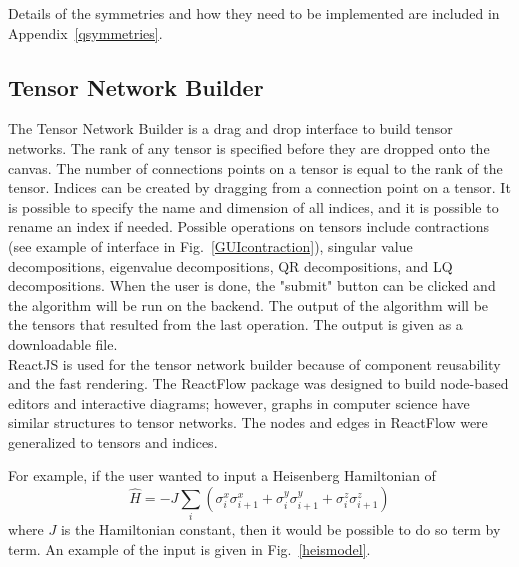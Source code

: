 \documentclass{juliacon}
\begin{document}
Details of the symmetries and how they need to be implemented are included in Appendix~\ref{qsymmetries}.


\subsection{Tensor Network Builder}
The Tensor Network Builder is a drag and drop interface to build tensor networks. The rank of any tensor is specified before they are dropped onto the canvas. The number of connections points on a tensor is equal to the rank of the tensor. Indices can be created by dragging from a connection point on a tensor. It is possible to specify the name and dimension of all indices, and it is possible to rename an index if needed. Possible operations on tensors include contractions (see example of interface in Fig.~\ref{GUIcontraction}), singular value decompositions, eigenvalue decompositions, QR decompositions, and LQ decompositions. When the user is done, the "submit" button can be clicked and the algorithm will be run on the backend. The output of the algorithm will be the tensors that resulted from the last operation. The output is given as a downloadable file.\\

ReactJS is used for the tensor network builder because of component reusability and the fast rendering. The ReactFlow package was designed to build node-based editors and interactive diagrams; however, graphs in computer science have similar structures to tensor networks. The nodes and edges in ReactFlow were generalized to tensors and indices. 

For example, if the user wanted to input a Heisenberg Hamiltonian of 
\begin{equation}\label{heisMPO}
\hat H = -J\sum_{i} \left( \sigma^x_i \sigma^x_{i+1} + \sigma^y_i \sigma^y_{i+1} + \sigma^z_i \sigma^z_{i+1}\right)
\end{equation}
where $J$ is the Hamiltonian constant, then it would be possible to do so term by term. An example of the input is given in Fig.~\ref{heismodel}.
\end{document}
